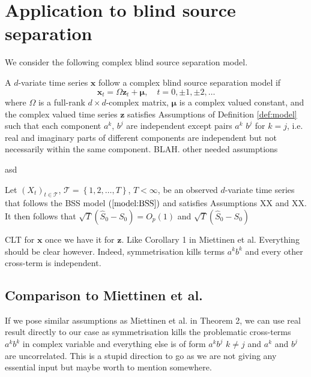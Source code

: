 \documentclass[11pt,a4paper,leqno]{amsart}
\newcommand{\1}{\mathbbm{1}}
\newcommand{\T}{\mathcal{T}}
\newcommand{\0}{\mathbf{0}}
\newcommand{\vx}{\mathbf{x}}
\newcommand{\vz}{\mathbf{z}}
\newcommand{\vmu}{\mathbf{\mu}}
\begin{document}
\section{Application to blind source separation}
We consider the following complex blind source separation model.
\begin{dfn}
A $d$-variate time series $\vx$ follow a complex blind source separation model if
\begin{equation}
\label{model:BSS}
\vx_t = \Omega \vz_t + \vmu,\quad t=0,\pm 1,\pm 2,\ldots
\end{equation}
where $\Omega$ is a full-rank $d \times d$-complex matrix, $\vmu$ is a complex valued constant, and the complex valued time series $\vz$ satisfies Assumptions of Definition \ref{def:model} such that each component $a^k$, $b^j$ are independent except pairs $a^k$ $b^j$ for $k=j$, i.e. real and imaginary parts of different components are independent but not necessarily within the same component. BLAH. other needed assumptions
\end{dfn}

\begin{rem}
asd
\end{rem}

\begin{lma}
Let $ \left(X_t \right)_{t\in \T}$, $\T = \left\{ 1,2,\ldots, T\right\}$, $T < \infty$, be an observed $d$-variate time series that follows the BSS model $\left(\ref{model:BSS}\right)$ and satisfies Assumptions XX and XX. It then follows   that $\sqrt{T}\left(\hat{S}_0 - S_0\right) = O_p(1)$ and $\sqrt{T}\left(\hat{S}_0 - S_0\right) $
\end{lma}
\begin{thm}
CLT for $\vx$ once we have it for $\vz$. Like Corollary 1 in Miettinen et al. Everything should be clear however. Indeed, symmetrisation kills terms $a^kb^k$ and every other cross-term is independent.
\end{thm}



\subsection{Comparison to Miettinen et al.}
If we pose similar assumptions as Miettinen et al. in Theorem 2, we can use real result directly to our case as symmetrisation kills the problematic cross-terms $a^kb^k$ in complex variable and everything else is of form $a^kb^j$ $k\neq j$ and $a^k$ and $b^j$ are uncorrelated. This is a stupid direction to go as we are not giving any essential input but maybe worth to mention somewhere.




\end{document}
